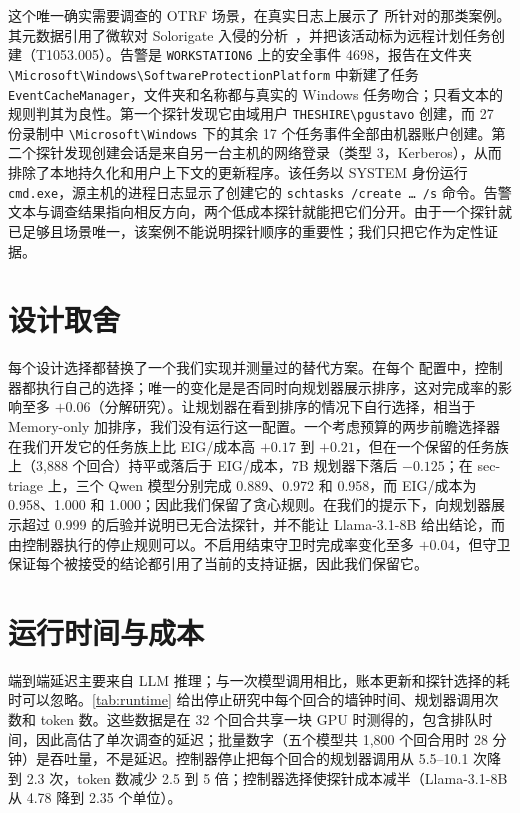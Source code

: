 这个唯一确实需要调查的 OTRF 场景，在真实日志上展示了 \hesp{} 所针对的那类案例。其元数据引用了微软对 Solorigate 入侵的分析~\citep{solorigate}，并把该活动标为远程计划任务创建（T1053.005）。告警是 \texttt{WORKSTATION6} 上的安全事件 4698，报告在文件夹 \texttt{\textbackslash Microsoft\textbackslash Windows\textbackslash Software\-Protection\-Platform} 中新建了任务 \texttt{EventCacheManager}，文件夹和名称都与真实的 Windows 任务吻合；只看文本的规则判其为良性。第一个探针发现它由域用户 \texttt{THESHIRE\textbackslash pgustavo} 创建，而 27 份录制中 \texttt{\textbackslash Microsoft\textbackslash Windows} 下的其余 17 个任务事件全部由机器账户创建。第二个探针发现创建会话是来自另一台主机的网络登录（类型 3，Kerberos），从而排除了本地持久化和用户上下文的更新程序。该任务以 SYSTEM 身份运行 \texttt{cmd.exe}，源主机的进程日志显示了创建它的 \texttt{schtasks /create \dots{} /s} 命令。告警文本与调查结果指向相反方向，两个低成本探针就能把它们分开。由于一个探针就已足够且场景唯一，该案例不能说明探针顺序的重要性；我们只把它作为定性证据。

\section{设计取舍}
\label{app:alternatives}

每个设计选择都替换了一个我们实现并测量过的替代方案。在每个 \hesp{} 配置中，控制器都执行自己的选择；唯一的变化是是否同时向规划器展示排序，这对完成率的影响至多 $+0.06$（分解研究）。让规划器在看到排序的情况下自行选择，相当于 Memory-only 加排序，我们没有运行这一配置。一个考虑预算的两步前瞻选择器在我们开发它的任务族上比 EIG/成本高 $+0.17$ 到 $+0.21$，但在一个保留的任务族上（3{,}888 个回合）持平或落后于 EIG/成本，7B 规划器下落后 $-0.125$；在 sec-triage 上，三个 Qwen 模型分别完成 0.889、0.972 和 0.958，而 EIG/成本为 0.958、1.000 和 1.000；因此我们保留了贪心规则。在我们的提示下，向规划器展示超过 0.999 的后验并说明已无合法探针，并不能让 Llama-3.1-8B 给出结论，而由控制器执行的停止规则可以。不启用结束守卫时完成率变化至多 $+0.04$，但守卫保证每个被接受的结论都引用了当前的支持证据，因此我们保留它。

\section{运行时间与成本}
\label{app:runtime}

端到端延迟主要来自 LLM 推理；与一次模型调用相比，账本更新和探针选择的耗时可以忽略。\cref{tab:runtime} 给出停止研究中每个回合的墙钟时间、规划器调用次数和 token 数。这些数据是在 32 个回合共享一块 GPU 时测得的，包含排队时间，因此高估了单次调查的延迟；批量数字（五个模型共 1{,}800 个回合用时 28 分钟）是吞吐量，不是延迟。控制器停止把每个回合的规划器调用从 5.5--10.1 次降到 2.3 次，token 数减少 2.5 到 5 倍；控制器选择使探针成本减半（Llama-3.1-8B 从 4.78 降到 2.35 个单位）。

